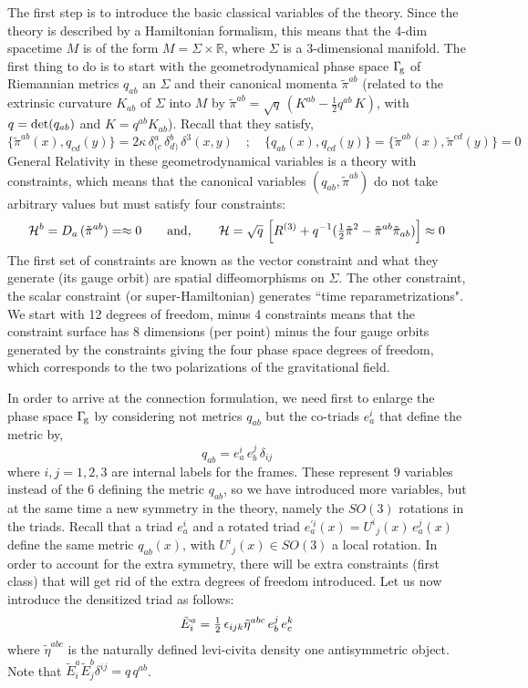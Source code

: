 \documentclass[aps,prd,tightenlines,showpacs,nofootinbib,preprint]{revtex4}
\def\be{\begin{equation}}
\def\ee{\end{equation}}
\def\tE{\tilde{E}}
\def\half{{\textstyle{1\over2}}}
\def\G{{\Gamma}}  \def\h{\hat} \def\H{{\cal H}} \def\O{{\cal O}}
\begin{document}
The first step is to introduce the basic classical variables of
the theory. Since the theory is described by a Hamiltonian
formalism, this means that the 4-dim spacetime $M$ is of the form
$M=\Sigma\times\mathbb{R}$, where $\Sigma$ is a 3-dimensional
manifold. The first thing to do is to start with the
geometrodynamical phase space $\G_{\!\rm g}$ of Riemannian metrics
$q_{ab}$ an $\Sigma$ and their canonical momenta
$\tilde{\pi}^{ab}$ (related to the extrinsic curvature $K_{ab}$ of
$\Sigma$ into $M$  by
$\tilde{\pi}^{ab}=\sqrt{q}\,(K^{ab}-\frac{1}{2}q^{ab}\,K)$, with
$q={\rm det}(q_{ab})$ and $K=q^{ab}K_{ab}$). Recall that they
satisfy,
%
\be
\{\tilde{\pi}^{ab}(x),q_{cd}(y)\}=2\kappa\,\delta^{a}_{(c}\,\delta^b_{d)}
\,\delta^3(x,y)\quad
;\quad
\{q_{ab}(x),q_{cd}(y)\}=\{\tilde{\pi}^{ab}(x),\tilde{\pi}^{cd}(y)\}=0
\ee
%
General Relativity in these geometrodynamical variables is a
theory with constraints, which means that the canonical variables
$(q_{ab},\tilde{\pi}^{ab})$ do not take arbitrary values but must
satisfy four constraints: \be {\cal
H}^b=D_a\,(\tilde{\pi}^{ab})=\approx 0 \qquad {\rm and},\qquad
{\cal
H}=\sqrt{q}\,\left[R^{(3)}+q^{-1}(\half{\tilde{\pi}^2}-\tilde{\pi}^{ab}
\tilde{\pi}_{ab})\right]\approx 0 \ee The first set of constraints
are known as the vector constraint and what they generate (its
gauge orbit) are spatial diffeomorphisms on $\Sigma$. The other
constraint, the scalar constraint (or super-Hamiltonian) generates
``time reparametrizations". We start with 12 degrees of freedom,
minus 4 constraints means that the constraint surface has 8
dimensions (per point) minus the four gauge orbits generated by
the constraints giving the four phase space degrees of freedom,
which corresponds to the two polarizations of the gravitational
field.

In order to arrive at the connection formulation, we need first to enlarge
the phase space $\G_{\!\rm g}$ by considering not metrics $q_{ab}$ but the
 co-triads $e_a^i$ that define the metric by,
\be q_{ab}=e_a^i\,e_b^j\,\delta_{ij} \ee where $i,j=1,2,3$ are
internal labels for the frames. These represent 9 variables
instead of the 6 defining the metric $q_{ab}$, so we have
introduced more variables, but  at the same time a new symmetry in
the theory, namely the $SO(3)$ rotations in the triads. Recall
that a triad $e_a^i$ and a rotated triad $e^{\prime
i}_a(x)={U^i}_j(x)\,e^j_a(x)$ define the same metric $q_{ab}(x)$,
with ${U^i}_j(x) \in SO(3)$ a local rotation. In order to account
for the extra symmetry, there will be extra constraints (first
class) that will get rid of the extra degrees of freedom
introduced. Let us now introduce the densitized triad as follows:
\be
\tilde{E}^a_i=\half\,\epsilon_{ijk}\tilde{\eta}^{abc}\,e^j_b\,e^k_c
\ee
%
where $\tilde{\eta}^{abc}$ is the naturally defined levi-civita
density one antisymmetric object. Note that
$\tE^a_i\tE^b_j\delta^{ij}=q\,q^{ab}$.
\end{document}
